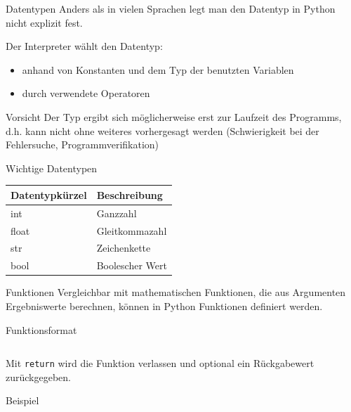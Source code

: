 \documentclass[xelatex,aspectratio=169]{beamer}
\begin{document}
\begin{frame}[allowframebreaks]{Datentypen}
  Anders als in vielen Sprachen legt man den Datentyp in Python nicht explizit fest.

  Der Interpreter wählt den Datentyp:
  \begin{itemize}
    \item anhand von Konstanten und dem Typ der benutzten Variablen
    \item durch verwendete Operatoren
  \end{itemize}

  \begin{alertblock}{Vorsicht}
    Der Typ ergibt sich möglicherweise erst zur Laufzeit des Programms, d.h. kann nicht ohne weiteres vorhergesagt werden (Schwierigkeit bei der Fehlersuche, Programmverifikation)
  \end{alertblock}

  \begin{exampleblock}{Wichtige Datentypen}
    \begin{table}
      \begin{tabular}{ll}
        \toprule
        \textbf{Datentypkürzel} & \textbf{Beschreibung} \\
        \midrule
        int                     & Ganzzahl              \\
        float                   & Gleitkommazahl        \\
        str                     & Zeichenkette          \\
        bool                    & Boolescher Wert       \\
        \bottomrule
      \end{tabular}
    \end{table}
  \end{exampleblock}
\end{frame}

\begin{frame}[allowframebreaks]{Funktionen}
  Vergleichbar mit mathematischen Funktionen, die aus Argumenten Ergebniswerte berechnen, können in Python Funktionen definiert werden.

  \begin{block}{Funktionsformat}
    \inputminted{python}{src/funktion_definition.py}
  \end{block}

  Mit \texttt{return} wird die Funktion verlassen und optional ein Rückgabewert zurückgegeben.

  \small
  \begin{exampleblock}{Beispiel}
    \inputminted{python}{src/function_example.py}
  \end{exampleblock}

\end{frame}

\end{document}
